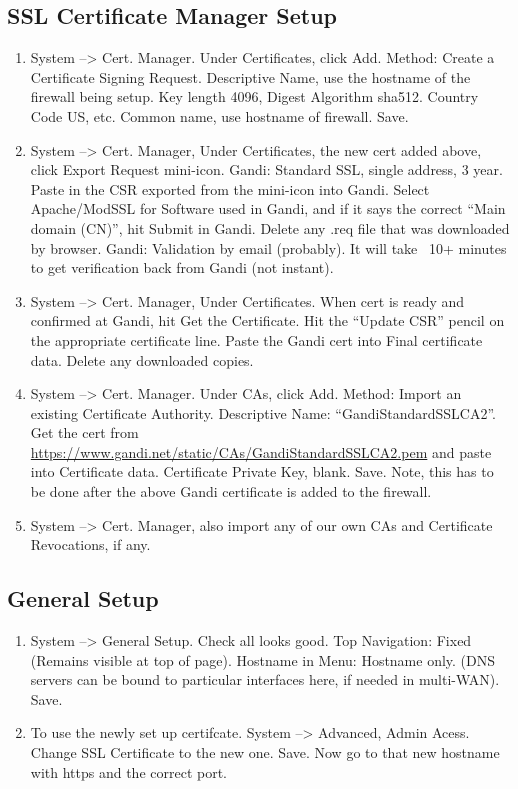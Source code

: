 \subsection{SSL Certificate Manager Setup}
\begin{enumerate}
 \item System --> Cert. Manager. Under Certificates, click Add. Method: Create a Certificate Signing Request. Descriptive Name, use the hostname of the firewall being setup. Key length 4096, Digest Algorithm sha512. Country Code US, etc. Common name, use hostname of firewall. Save.
 \item System --> Cert. Manager, Under Certificates, the new cert added above, click Export Request mini-icon. Gandi: Standard SSL, single address, 3 year. Paste in the CSR exported from the mini-icon into Gandi. Select Apache/ModSSL for Software used in Gandi, and if it says the correct ``Main domain (CN)'', hit Submit in Gandi. Delete any .req file that was downloaded by browser. Gandi: Validation by email (probably). It will take ~10+ minutes to get verification back from Gandi (not instant).
 \item System --> Cert. Manager, Under Certificates. When cert is ready and confirmed at Gandi, hit Get the Certificate. Hit the ``Update CSR'' pencil on the appropriate certificate line. Paste the Gandi cert into Final certificate data. Delete any downloaded copies.
 \item System --> Cert. Manager. Under CAs, click Add. Method: Import an existing Certificate Authority. Descriptive Name: ``GandiStandardSSLCA2''. Get the cert from \url{https://www.gandi.net/static/CAs/GandiStandardSSLCA2.pem} and paste into Certificate data. Certificate Private Key, blank. Save. Note, this has to be done after the above Gandi certificate is added to the firewall.
 \item System --> Cert. Manager, also import any of our own CAs and Certificate Revocations, if any.
\end{enumerate}

\subsection{General Setup}
\begin{enumerate}
 \item System --> General Setup. Check all looks good. Top Navigation: Fixed (Remains visible at top of page). Hostname in Menu: Hostname only. (DNS servers can be bound to particular interfaces here, if needed in multi-WAN). Save.
 \item To use the newly set up certifcate. System --> Advanced, Admin Acess. Change SSL Certificate to the new one. Save. Now go to that new hostname with https and the correct port.
\end{enumerate}

